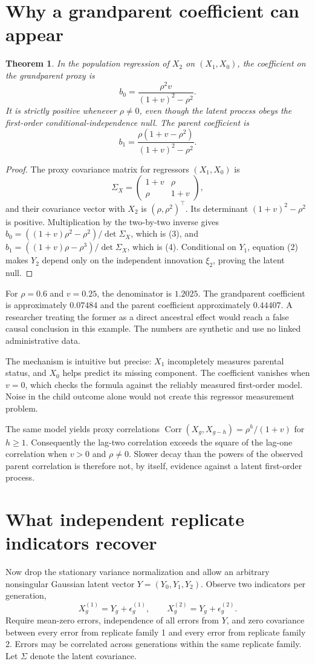 \documentclass[11pt,a4paper]{article}
\newtheorem{theorem}{Theorem}[section]
\begin{document}
\section{Why a grandparent coefficient can appear}
\begin{theorem}
In the population regression of $X_2$ on $(X_1,X_0)$, the coefficient on the grandparent proxy is
\[
 b_0=\frac{\rho^2v}{(1+v)^2-\rho^2}.
 \tag{3}
\]
It is strictly positive whenever $\rho\ne0$, even though the latent process obeys the first-order conditional-independence null. The parent coefficient is
\[
 b_1=\frac{\rho(1+v-\rho^2)}
 {(1+v)^2-\rho^2}.
 \tag{4}
\]
\end{theorem}
\begin{proof}
The proxy covariance matrix for regressors $(X_1,X_0)$ is
\[
 \Sigma_X=
 \begin{pmatrix}1+v&\rho\\\rho&1+v\end{pmatrix},
\]
and their covariance vector with $X_2$ is $(\rho,\rho^2)^\top$. Its determinant $(1+v)^2-\rho^2$ is positive. Multiplication by the two-by-two inverse gives
$b_0=((1+v)\rho^2-\rho^2)/\det\Sigma_X$, which is (3), and
$b_1=((1+v)\rho-\rho^3)/\det\Sigma_X$, which is (4). Conditional on $Y_1$, equation (2) makes $Y_2$ depend only on the independent innovation $\xi_2$, proving the latent null.
\end{proof}
For $\rho=0.6$ and $v=0.25$, the denominator is $1.2025$. The grandparent coefficient is approximately $0.07484$ and the parent coefficient approximately $0.44407$. A researcher treating the former as a direct ancestral effect would reach a false causal conclusion in this example. The numbers are synthetic and use no linked administrative data.

The mechanism is intuitive but precise: $X_1$ incompletely measures parental status, and $X_0$ helps predict its missing component. The coefficient vanishes when $v=0$, which checks the formula against the reliably measured first-order model. Noise in the child outcome alone would not create this regressor measurement problem.

The same model yields proxy correlations
$\operatorname{Corr}(X_g,X_{g-h})=\rho^h/(1+v)$ for $h\ge1$. Consequently the lag-two correlation exceeds the square of the lag-one correlation when $v>0$ and $\rho\ne0$. Slower decay than the powers of the observed parent correlation is therefore not, by itself, evidence against a latent first-order process.
\section{What independent replicate indicators recover}
Now drop the stationary variance normalization and allow an arbitrary nonsingular Gaussian latent vector $Y=(Y_0,Y_1,Y_2)$. Observe two indicators per generation,
\[
 X_g^{(1)}=Y_g+\epsilon_g^{(1)},\qquad
 X_g^{(2)}=Y_g+\epsilon_g^{(2)}.
\]
Require mean-zero errors, independence of all errors from $Y$, and zero covariance between every error from replicate family 1 and every error from replicate family 2. Errors may be correlated across generations within the same replicate family. Let $\Sigma$ denote the latent covariance.
\end{document}
